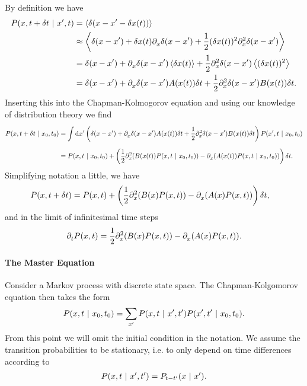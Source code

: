 By definition we have
\begin{align*}
	P(x, t + \delta t \ | \  x^{\prime}, t) &= \expval{\delta(x - x\ensuremath{^{\prime}}- \delta x(t))} \\
	                              &\approx \expval{\delta(x - x\ensuremath{^{\prime}}) + \delta x(t)\ensuremath{\partial^{}_{x}}{\delta(x - x\ensuremath{^{\prime}})} + \frac{1}{2}(\delta x(t))^{2}\ensuremath{\partial^{2}_{x}}{\delta(x - x\ensuremath{^{\prime}})}} \\
	                              &= \delta(x - x^{\prime}) + \partial^{}_{x}{\delta(x - x^{\prime})}\expval{\delta x(t)} + \frac{1}{2}\partial^{2}_{x}{\delta(x - x^{\prime})}\expval{(\delta x(t))^{2}} \\
	                              &= \delta(x - x^{\prime}) + \partial^{}_{x}{\delta(x - x^{\prime})}A(x(t))\delta t + \frac{1}{2}\partial^{2}_{x}{\delta(x - x^{\prime})}B(x(t))\delta t.
\end{align*}
Inserting this into the Chapman-Kolmogorov equation and using our knowledge of distribution theory we find
\begin{align*}
	P(x, t + \delta t \ | \  x_{0}, t_{0}) &= \int\limits_{}^{}\dd[]{x\ensuremath{^{\prime}}}\left(\delta(x - x^{\prime}) + \partial^{}_{x}{\delta(x - x^{\prime})}A(x(t))\delta t + \frac{1}{2}\partial^{2}_{x}{\delta(x - x^{\prime})}B(x(t))\delta t\right)P(x^{\prime}, t \ | \  x_{0}, t_{0}) \\
	                                      &= P(x, t \ | \  x_{0}, t_{0}) + \left(\frac{1}{2}\partial^{2}_{x}{(B(x(t))P(x, t \ | \  x_{0}, t_{0}))} - \partial^{}_{x}{(A(x(t))P(x, t \ | \  x_{0}, t_{0}))}\right)\delta t.
\end{align*}
Simplifying notation a little, we have
\begin{align*}
	P(x, t + \delta t) &= P(x, t) + \left(\frac{1}{2}\partial^{2}_{x}{(B(x)P(x, t))} - \partial^{}_{x}{(A(x)P(x, t))}\right)\delta t,
\end{align*}
and in the limit of infinitesimal time steps
\begin{align*}
	\partial^{}_{t}{P(x, t)} = \frac{1}{2}\partial^{2}_{x}{(B(x)P(x, t))} - \partial^{}_{x}{(A(x)P(x, t))}.
\end{align*}

\paragraph{The Master Equation}
Consider a Markov process with discrete state space. The Chapman-Kolgomorov equation then takes the form
\begin{align*}
	P(x, t \ | \  x_{0}, t_{0}) = \sum\limits_{x^{\prime}}P(x, t \ | \  x^{\prime}, t^{\prime})P(x^{\prime}, t^{\prime} \ | \  x_{0}, t_{0}).
\end{align*}
From this point we will omit the initial condition in the notation. We assume the transition probabilities to be stationary, i.e. to only depend on time differences according to
\begin{align*}
	P(x, t \ | \  x^{\prime}, t^{\prime}) = P_{t - t^{\prime}}(x \ | \  x^{\prime}).
\end{align*}

